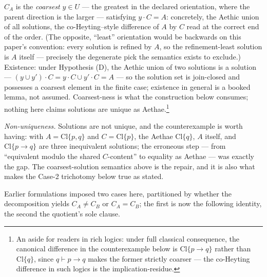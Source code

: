 \begin{defin}\label{def:coarsest}
$C_A$ is the \emph{coarsest} $y \in U$ --- the greatest in the declared orientation, where the parent direction is the larger --- satisfying $y \cdot C = A$: concretely, the Aethic union of all solutions, the co-Heyting--style difference of $A$ by $C$ read at the correct end of the order. (The opposite, ``least'' orientation would be backwards on this paper's convention: every solution is refined by $A$, so the refinement-least solution is $A$ itself --- precisely the degenerate pick the semantics exists to exclude.) Existence: under Hypothesis (D), the Aethic union of two solutions is a solution --- $(y \cup y')\cdot C = y\cdot C \cup y'\cdot C = A$ --- so the solution set is join-closed and possesses a coarsest element in the finite case; existence in general is a booked lemma, not assumed. Coarsest-ness is what the construction below consumes; nothing here claims solutions are unique as Aethae.\footnote{An aside for readers in rich logics: under full classical consequence, the canonical difference in the counterexample below is $\mathrm{Cl}\{p \rightarrow q\}$ rather than $\mathrm{Cl}\{q\}$, since $q \vdash p \rightarrow q$ makes the former strictly coarser --- the co-Heyting difference in such logics is the implication-residue.}
\end{defin}

\noindent \emph{Non-uniqueness.} Solutions are not unique, and the counterexample is worth having: with $A = \mathrm{Cl}\{p, q\}$ and $C = \mathrm{Cl}\{p\}$, the Aethae $\mathrm{Cl}\{q\}$, $A$ itself, and $\mathrm{Cl}\{p \rightarrow q\}$ are three inequivalent solutions; the erroneous step --- from ``equivalent modulo the shared $C$-content'' to equality as Aethae --- was exactly the gap. The coarsest-solution semantics above is the repair, and it is also what makes the Case-2 trichotomy below true as stated.

Earlier formulations imposed two cases here, partitioned by whether the decomposition yields $C_A \neq C_B$ or $C_A = C_B$; the first is now the following identity, the second the quotient's sole clause.

